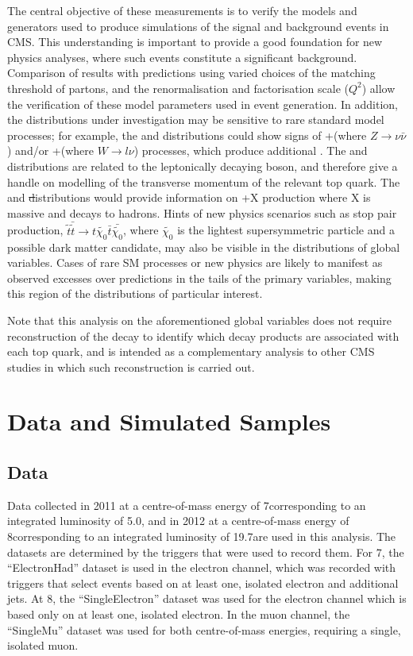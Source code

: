 The central objective of these measurements is to verify the models and generators used to produce simulations
of the signal and background events in CMS. This understanding is important to provide a good foundation for
new physics analyses, where such events constitute a significant background. Comparison of results with
predictions using varied choices of the matching threshold of partons, and the renormalisation and
factorisation scale ($Q^{2}$) allow the verification of these model parameters used in event generation. In
addition, the distributions under investigation may be sensitive to rare standard model processes; for
example, the \met and \mt distributions could show signs of \ttbar+\Z (where $Z\rightarrow \nu\bar{\nu}$)
and/or \ttbar+\W (where $W\rightarrow l\nu$) processes, which produce additional \met. The \wpt and \mt
distributions are related to the leptonically decaying \W boson, and therefore give a handle on modelling of
the transverse momentum of the relevant top quark. The \HT and \st distributions would provide information on
\ttbar+X production where X is massive and decays to hadrons. Hints of new physics scenarios such as stop pair
production, $\tilde{t}\bar{\tilde{t}} \rightarrow t\tilde{\chi_0} \bar{t}\bar{\tilde{\chi_0}}$, where
$\tilde{\chi_0}$ is the lightest supersymmetric particle and a possible dark matter candidate, may also be
visible in the distributions of global variables. Cases of rare SM processes or new physics are likely to
manifest as observed excesses over predictions in the tails of the primary variables, making this region of
the distributions of particular interest.

Note that this analysis on the aforementioned global variables does not require reconstruction of the \ttbar
decay to identify which decay products are associated with each top quark, and is intended as a complementary
analysis to other CMS studies in which such reconstruction is carried out.

\section{Data and Simulated Samples}
\label{s:data_and_simulated_samples}

\subsection{Data}
\label{ss:data}

Data collected in 2011 at a centre-of-mass energy of 7\TeV corresponding to an integrated luminosity of
5.0\fbinv, and in 2012 at a centre-of-mass energy of 8\TeV corresponding to an integrated luminosity of
19.7\fbinv are used in this analysis. The datasets are determined by the triggers that were used to record
them. For 7\TeV, the ``ElectronHad'' dataset is used in the electron channel, which was recorded with triggers
that select events based on at least one, isolated electron and additional jets. At 8\TeV, the
``SingleElectron'' dataset was used for the electron channel which is based only on at least one, isolated
electron. In the muon channel, the ``SingleMu'' dataset was used for both centre-of-mass energies, requiring a
single, isolated muon.

